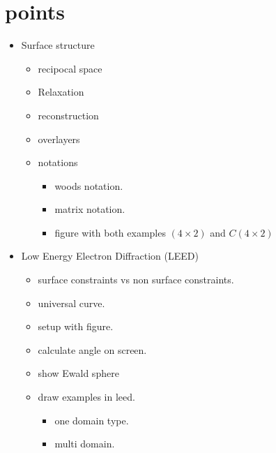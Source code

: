 \documentclass[article,a4paper,openleft]{memoir}
\begin{document}
\section{points}
\begin{itemize}
        \item Surface structure
        \begin{itemize}
                \item recipocal space
                \item Relaxation
                \item reconstruction
                \item overlayers
                \item notations
                        \begin{itemize}
                                \item woods notation.
                                \item matrix notation.
                                \item figure with both examples $(4\times2)$ and $C(4\times2)$
                        \end{itemize}
        \end{itemize}
        \item Low Energy Electron Diffraction (LEED)
                \begin{itemize}
                        \item surface constraints vs non surface constraints.
                        \item universal curve.
                        \item setup with figure.
                        \item calculate angle on screen.
                        \item show Ewald sphere
                        \item draw examples in leed.
                                \begin{itemize}
                                        \item one domain type.
                                        \item multi domain.
                                \end{itemize}
                \end{itemize}
\end{itemize}
\end{document}
